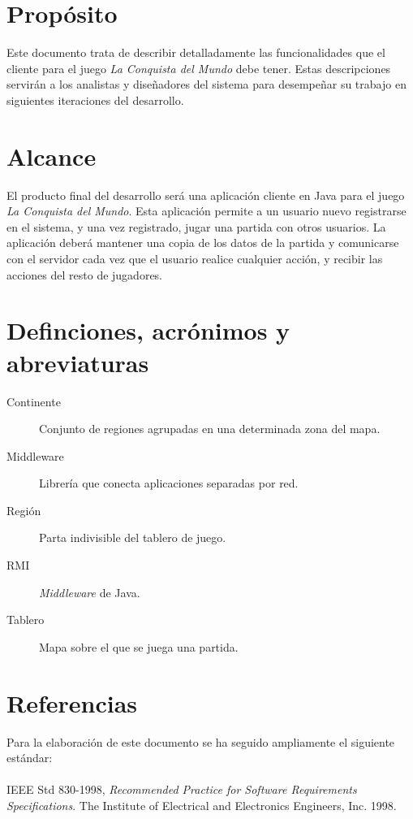 \section{Propósito}

Este documento trata de describir detalladamente las funcionalidades que el
cliente para el juego \textit{La Conquista del Mundo} debe tener. Estas
descripciones servirán a los analistas y diseñadores del sistema para
desempeñar su trabajo en siguientes iteraciones del desarrollo.

\section{Alcance}

El producto final del desarrollo será una aplicación cliente en Java para el
juego \textit{La Conquista del Mundo}. Esta aplicación permite a un usuario
nuevo registrarse en el sistema, y una vez registrado, jugar una partida con
otros usuarios. La aplicación deberá mantener una copia de los datos de la
partida y comunicarse con el servidor cada vez que el usuario realice cualquier
acción, y recibir las acciones del resto de jugadores.

\section{Definciones, acrónimos y abreviaturas}

\begin{description}
\item [Continente] Conjunto de regiones agrupadas en una determinada zona del
mapa.
\item [Middleware] Librería que conecta aplicaciones separadas por red.
\item [Región] Parta indivisible del tablero de juego.
\item [RMI] \textit{Middleware} de Java.
\item [Tablero] Mapa sobre el que se juega una partida.
\end{description}

\section{Referencias}

Para la elaboración de este documento se ha seguido ampliamente el siguiente
estándar:\\
\\
IEEE Std 830-1998, \textit{Recommended Practice for Software Requirements
Specifications}.
The Institute of Electrical and Electronics Engineers, Inc. 1998.\\

